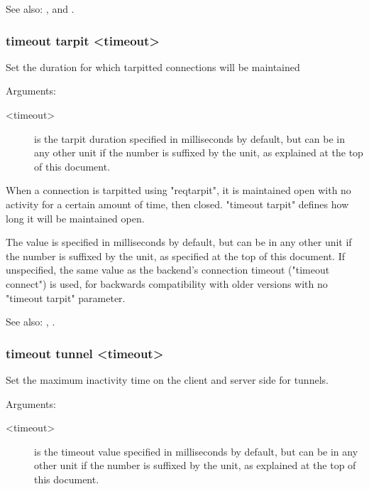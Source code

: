   See also: ,  and .


\subsubsection[timeout tarpit]{timeout tarpit <timeout>}


  Set the duration for which tarpitted connections will be maintained


  Arguments:
  \begin{description}
  \item[<timeout>] is the tarpit duration specified in milliseconds by default, but
              can be in any other unit if the number is suffixed by the unit,
              as explained at the top of this document.
  \end{description}

  When a connection is tarpitted using "reqtarpit", it is maintained open with
  no activity for a certain amount of time, then closed. "timeout tarpit"
  defines how long it will be maintained open.

  The value is specified in milliseconds by default, but can be in any other
  unit if the number is suffixed by the unit, as specified at the top of this
  document. If unspecified, the same value as the backend's connection timeout
  ("timeout connect") is used, for backwards compatibility with older versions
  with no "timeout tarpit" parameter.

  See also: , .

\subsubsection[timeout tunnel]{timeout tunnel <timeout>}

  Set the maximum inactivity time on the client and server side for tunnels.


  Arguments:
  \begin{description}
  \item[<timeout>] is the timeout value specified in milliseconds by default, but
              can be in any other unit if the number is suffixed by the unit,
              as explained at the top of this document.
  \end{description}

